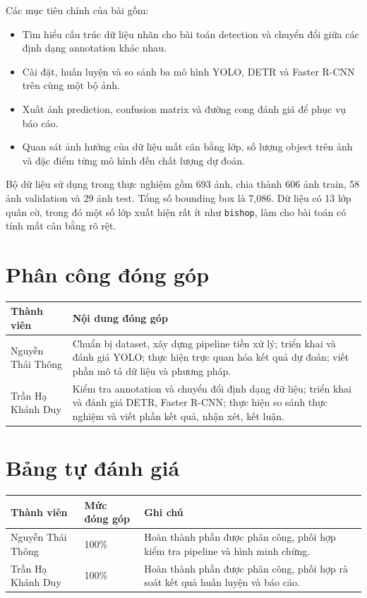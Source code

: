 \documentclass[12pt,a4paper]{article}
\begin{document}
Các mục tiêu chính của bài gồm:
\begin{itemize}[leftmargin=1.2cm]
    \item Tìm hiểu cấu trúc dữ liệu nhãn cho bài toán detection và chuyển đổi giữa các định dạng annotation khác nhau.
    \item Cài đặt, huấn luyện và so sánh ba mô hình YOLO, DETR và Faster R-CNN trên cùng một bộ ảnh.
    \item Xuất ảnh prediction, confusion matrix và đường cong đánh giá để phục vụ báo cáo.
    \item Quan sát ảnh hưởng của dữ liệu mất cân bằng lớp, số lượng object trên ảnh và đặc điểm từng mô hình đến chất lượng dự đoán.
\end{itemize}

Bộ dữ liệu sử dụng trong thực nghiệm gồm 693 ảnh, chia thành 606 ảnh train, 58 ảnh validation và 29 ảnh test. Tổng số bounding box là 7{,}086. Dữ liệu có 13 lớp quân cờ, trong đó một số lớp xuất hiện rất ít như \texttt{bishop}, làm cho bài toán có tính mất cân bằng rõ rệt.

\section{Phân công đóng góp}

\begin{longtable}{p{}p{}}
\toprule
\textbf{Thành viên} & \textbf{Nội dung đóng góp} \\
\midrule
Nguyễn Thái Thông & Chuẩn bị dataset, xây dựng pipeline tiền xử lý; triển khai và đánh giá YOLO; thực hiện trực quan hóa kết quả dự đoán; viết phần mô tả dữ liệu và phương pháp. \\
Trần Hạ Khánh Duy & Kiểm tra annotation và chuyển đổi định dạng dữ liệu; triển khai và đánh giá DETR, Faster R-CNN; thực hiện so sánh thực nghiệm và viết phần kết quả, nhận xét, kết luận. \\
\bottomrule
\end{longtable}

\section{Bảng tự đánh giá}

\begin{longtable}{p{}p{}p{}}
\toprule
\textbf{Thành viên} & \textbf{Mức đóng góp} & \textbf{Ghi chú} \\
\midrule
Nguyễn Thái Thông & 100\% & Hoàn thành phần được phân công, phối hợp kiểm tra pipeline và hình minh chứng. \\
Trần Hạ Khánh Duy & 100\% & Hoàn thành phần được phân công, phối hợp rà soát kết quả huấn luyện và báo cáo. \\
\bottomrule
\end{longtable}
\end{document}
